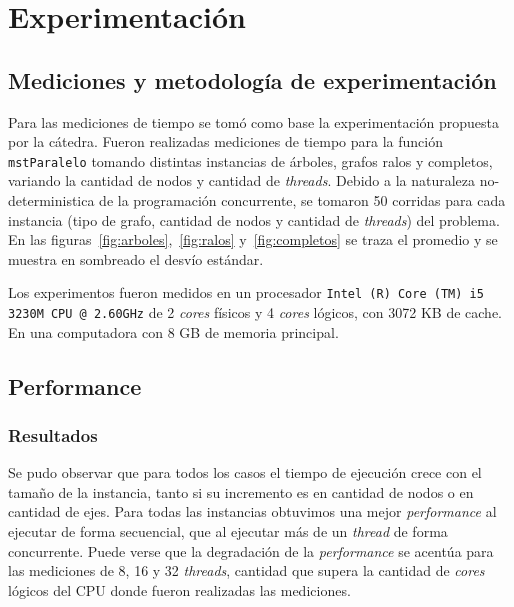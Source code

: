 \section{Experimentación}
\subsection{Mediciones y metodología de experimentación}

Para las mediciones de tiempo se tomó como base la experimentación propuesta
por la cátedra.
Fueron realizadas mediciones de tiempo para la función \texttt{mstParalelo}
tomando distintas instancias de árboles, grafos ralos y completos, variando la
cantidad de nodos y cantidad de \textit{threads}.
Debido a la naturaleza no-deterministica de la programación concurrente, se
tomaron 50 corridas para cada instancia (tipo de grafo, cantidad de nodos y
cantidad de \textit{threads}) del problema. En las
figuras~\ref{fig:arboles},~\ref{fig:ralos} y~\ref{fig:completos} se traza el
promedio y se muestra en sombreado el desvío estándar.

Los experimentos fueron medidos en un procesador \texttt{Intel (R) Core (TM) i5
3230M CPU @ 2.60GHz} de 2 \textit{cores} físicos y 4 \textit{cores} lógicos,
con 3072 KB de cache. En una computadora con 8 GB de memoria principal.

\subsection{Performance}
\subsubsection{Resultados}

Se pudo observar que para todos los casos el tiempo de ejecución crece con el
tamaño de la instancia, tanto si su incremento es en cantidad de nodos o en
cantidad de ejes.
Para todas las instancias obtuvimos una mejor
\textit{performance} al ejecutar de forma secuencial, que al ejecutar más de un
\textit{thread} de forma
concurrente.
Puede verse que la degradación de la \textit{performance} se acentúa para las
mediciones de 8, 16 y 32 \textit{threads}, cantidad que supera la cantidad de
\textit{cores} lógicos del CPU donde fueron realizadas las mediciones.

